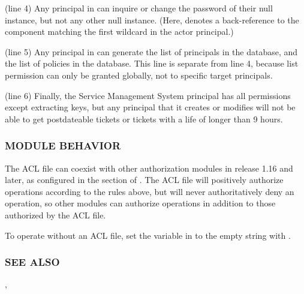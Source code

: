 \documentclass[letterpaper,10pt,english]{sphinxmanual}
\begin{document}
(line 4) Any  principal in  can inquire
or change the password of their null instance, but not any other
null instance.  (Here,  denotes a back-reference to the
component matching the first wildcard in the actor principal.)

(line 5) Any  principal in  can generate
the list of principals in the database, and the list of policies
in the database.  This line is separate from line 4, because list
permission can only be granted globally, not to specific target
principals.

(line 6) Finally, the Service Management System principal
 has all permissions except extracting keys, but
any principal that it creates or modifies will not be able to get
postdateable tickets or tickets with a life of longer than 9 hours.


\subsubsection{MODULE BEHAVIOR}
\label{\detokenize{admin/conf_files/kadm5_acl:module-behavior}}
The ACL file can coexist with other authorization modules in release
1.16 and later, as configured in the {\hyperref[\detokenize{admin/conf_files/krb5_conf:kadm5-auth}]{}} section of
{\hyperref[\detokenize{admin/conf_files/krb5_conf:krb5-conf-5}]{}}.  The ACL file will positively authorize
operations according to the rules above, but will never
authoritatively deny an operation, so other modules can authorize
operations in addition to those authorized by the ACL file.

To operate without an ACL file, set the  variable in
{\hyperref[\detokenize{admin/conf_files/kdc_conf:kdc-conf-5}]{}} to the empty string with .


\subsubsection{SEE ALSO}
\label{\detokenize{admin/conf_files/kadm5_acl:see-also}}
{\hyperref[\detokenize{admin/conf_files/kdc_conf:kdc-conf-5}]{}}, {\hyperref[\detokenize{admin/admin_commands/kadmind:kadmind-8}]{}}
\end{document}
